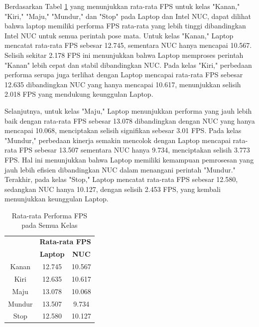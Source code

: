 Berdasarkan Tabel \ref{tb:fpsall} yang menunjukkan rata-rata FPS untuk kelas "Kanan," "Kiri," "Maju," "Mundur," dan "Stop" pada Laptop dan Intel NUC, dapat dilihat bahwa laptop memiliki performa FPS rata-rata yang lebih tinggi dibandingkan Intel NUC untuk semua perintah pose mata. Untuk kelas "Kanan," Laptop mencatat rata-rata FPS sebesar 12.745, sementara NUC hanya mencapai 10.567. Selisih sekitar 2.178 FPS ini menunjukkan bahwa Laptop memproses perintah "Kanan" lebih cepat dan stabil dibandingkan NUC. Pada kelas "Kiri," perbedaan performa serupa juga terlihat dengan Laptop mencapai rata-rata FPS sebesar 12.635 dibandingkan NUC yang hanya mencapai 10.617, menunjukkan selisih 2.018 FPS yang mendukung keunggulan Laptop.

Selanjutnya, untuk kelas "Maju," Laptop menunjukkan performa yang jauh lebih baik dengan rata-rata FPS sebesar 13.078 dibandingkan dengan NUC yang hanya mencapai 10.068, menciptakan selisih signifikan sebesar 3.01 FPS. Pada kelas "Mundur," perbedaan kinerja semakin mencolok dengan Laptop mencapai rata-rata FPS sebesar 13.507 sementara NUC hanya 9.734, menciptakan selisih 3.773 FPS. Hal ini menunjukkan bahwa Laptop memiliki kemampuan pemrosesan yang jauh lebih efisien dibandingkan NUC dalam menangani perintah "Mundur." Terakhir, pada kelas "Stop," Laptop mencatat rata-rata FPS sebesar 12.580, sedangkan NUC hanya 10.127, dengan selisih 2.453 FPS, yang kembali menunjukkan keunggulan Laptop.

\begin{longtable}{|c|c|c|}
  \caption{Rata-rata Performa FPS pada Semua Kelas}
  \label{tb:fpsall} \\
  \hline
  \rowcolor[HTML]{D0D0D0} 
  \multicolumn{1}{|c|}{\cellcolor[HTML]{D0D0D0}}                                 & \multicolumn{2}{c|}{\cellcolor[HTML]{D0D0D0}\textbf{Rata-rata FPS}}         \\ \cline{2-3} 
  \rowcolor[HTML]{D0D0D0} 
  \multicolumn{1}{|c|}{\multirow{-2}{*}{\cellcolor[HTML]{D0D0D0}\textbf{Kelas}}} & \multicolumn{1}{c|}{\cellcolor[HTML]{D0D0D0}\textbf{Laptop}} & \textbf{NUC} \\ \hline
  Kanan                                                                          & \multicolumn{1}{c|}{12.745}                                  & 10.567       \\ \hline
  Kiri                                                                           & \multicolumn{1}{c|}{12.635}                                  & 10.617       \\ \hline
  Maju                                                                           & \multicolumn{1}{c|}{13.078}                                  & 10.068       \\ \hline
  Mundur                                                                         & \multicolumn{1}{c|}{13.507}                                  & 9.734        \\ \hline
  Stop                                                                           & \multicolumn{1}{c|}{12.580}                                  & 10.127       \\ \hline
 
\end{longtable}

